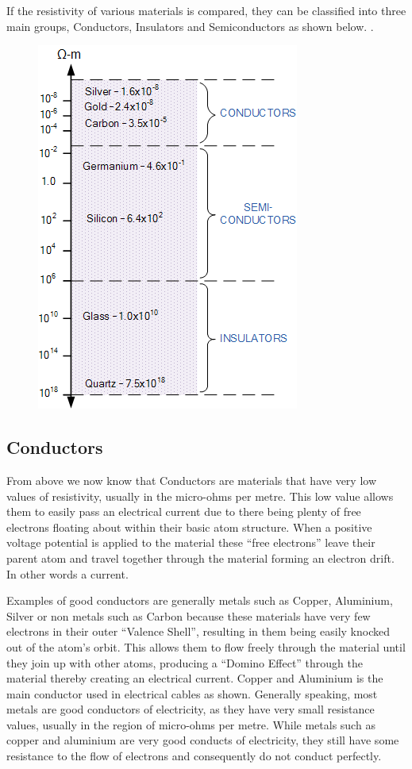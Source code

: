 \documentclass[main]{subfiles}
\begin{document}
If the resistivity of various materials is compared, they can be classified into three main groups, Conductors, Insulators and Semiconductors as shown below. \cite{diode-basics}.

\begin{figure}[H]
\centering
\includegraphics[width=0.3\linewidth]{figs/resistivity.png}
\end{figure}

\subsection{Conductors}
From above we now know that Conductors are materials that have very low values of resistivity, usually in the micro-ohms per metre. This low value allows them to easily pass an electrical current due to there being plenty of free electrons floating about within their basic atom structure. When a positive voltage potential is applied to the material these “free electrons” leave their parent atom and travel together through the material forming an electron drift. In other words a current.

Examples of good conductors are generally metals such as Copper, Aluminium, Silver or non metals such as Carbon because these materials have very few electrons in their outer “Valence Shell”, resulting in them being easily knocked out of the atom’s orbit. This allows them to flow freely through the material until they join up with other atoms, producing a “Domino Effect” through the material thereby creating an electrical current. Copper and Aluminium is the main conductor used in electrical cables as shown.
Generally speaking, most metals are good conductors of electricity, as they have very small resistance values, usually in the region of micro-ohms per metre. While metals such as copper and aluminium are very good conducts of electricity, they still have some resistance to the flow of electrons and consequently do not conduct perfectly.
\end{document}
